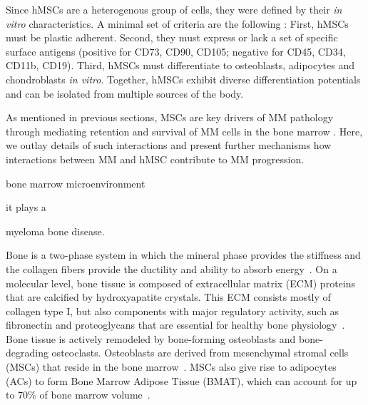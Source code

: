 Since hMSCs are a heterogenous group of cells, they were defined by their
\textit{in vitro} characteristics. A minimal set of criteria are the following
\cite{dominiciMinimalCriteriaDefining2006}: First, hMSCs must be plastic
adherent. Second, they must express or lack a set of specific surface antigens
(positive for CD73, CD90, CD105; negative for CD45, CD34, CD11b, CD19). Third,
hMSCs must differentiate to osteoblasts, adipocytes and chondroblasts \textit{in
    vitro}. Together, hMSCs exhibit diverse differentiation potentials and can be
isolated from multiple sources of the body.




\label{sec:intro_myeloma_hMSC}
As mentioned in previous sections, MSCs are key drivers of MM pathology through
mediating retention and survival of MM cells in the bone marrow
\cite{mangoliniBoneMarrowStromal2020}. Here, we outlay details of such
interactions and present further mechanisms how interactions between MM and hMSC
contribute to MM progression.

bone marrow microenvironment



it plays a

myeloma bone disease.

Bone is a two-phase system in which the mineral phase provides the stiffness and
the collagen fibers provide the ductility and ability to absorb
energy~\cite{viguet-carrinRoleCollagenBone2006}. On a molecular level, bone
tissue is composed of extracellular matrix (ECM) proteins that are calcified by
hydroxyapatite crystals. This ECM consists mostly of collagen type I, but also
components with major regulatory activity, such as fibronectin and proteoglycans
that are essential for healthy bone
physiology~\cite{alcorta-sevillanoDecipheringRelevanceBone2020}. Bone tissue is
actively remodeled by bone-forming osteoblasts and bone-degrading osteoclasts.
Osteoblasts are derived from mesenchymal stromal cells (MSCs) that reside in the
bone marrow~\cite{friedensteinOsteogenesisTransplantsBone1966,
    pittengerMultilineagePotentialAdult1999}. MSCs also give rise to adipocytes
(ACs) to form Bone Marrow Adipose Tissue (BMAT), which can account for up to
70\% of bone marrow volume~\cite{fazeliMarrowFatBone2013}.

